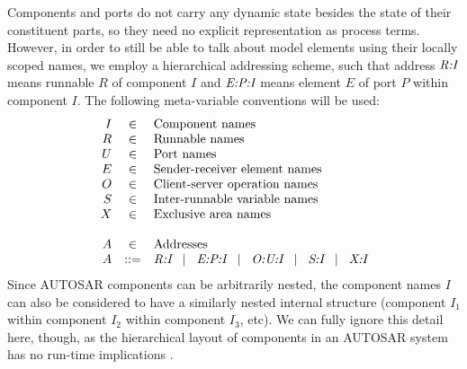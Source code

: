 \documentclass[twocolumn]{article}
\newcommand{\adr}[1]{\mbox{\em #1}}
\newcommand{\sep}{\hspace{2ex}|\hspace{2ex}}
\begin{document}
Components and ports do not carry any dynamic state besides the state of their constituent parts, so they need no explicit representation as process terms. However, in order to still be able to talk about model elements using their locally scoped names, we employ a hierarchical addressing scheme, such that address $\adr{R:I} $ means runnable $R$ of component $I$ and $\adr{E:P:I}$ means element $E$ of port $P$ within component $I$. The following meta-variable conventions will be used:
$$
\begin{array}{rcll}
	I	& \in		& \mbox{Component names} \\
	R	& \in		& \mbox{Runnable names} \\
	U	& \in		& \mbox{Port names} \\
	E	& \in		& \mbox{Sender-receiver element names} \\
	O	& \in		& \mbox{Client-server operation names} \\
	S	& \in		& \mbox{Inter-runnable variable names} \\
	X	& \in		& \mbox{Exclusive area names} \\
	\\
	A	& \in		& \mbox{Addresses} \\
	A	& ::=		& \adr{R:I}   \sep   \adr{E:P:I}   \sep   \adr{O:U:I}   \sep   \adr{S:I}   \sep   \adr{X:I}   \\
\end{array}
$$
Since AUTOSAR components can be arbitrarily nested, the component names $I$ can also be considered to have a similarly nested internal structure (component $I_1$ within component $I_2$ within component $I_3$, etc). We can fully ignore this detail here, though, as the hierarchical layout of components in an AUTOSAR system has no run-time implications \cite{}.
\end{document}
